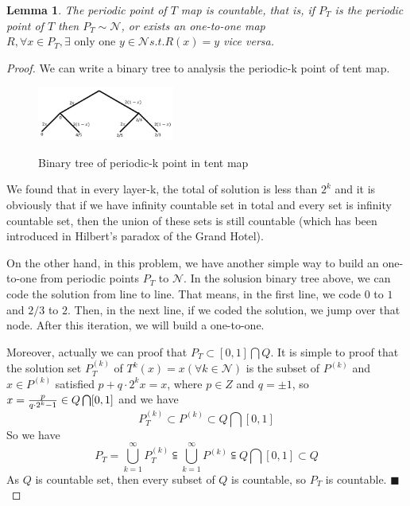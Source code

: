 \documentclass[12pt]{article}
\theoremstyle{plain}
\newtheorem{lemma}{\textbf{Lemma}}[section]
\newtheorem{proof}{\textit{PROOF}}[section]
\begin{document}
\newpage
\begin{lemma} The periodic point of $T$ map is countable, that is, if $P_T$ is the periodic point of $T$ then $P_T \sim \mathcal N$, or exists an one-to-one map $R, \forall x \in P_T, \exists \text{ only one } y \in \mathcal N s.t. R(x) = y$ vice versa.
\end{lemma}
{\color{blue}
\begin{proof}
We can write a binary tree to analysis the periodic-k point of tent map.
\begin{figure}[H]
\begin{center}
\includegraphics[width=0.4\textwidth]{figure/section3/solution-tent.png} \\
\caption{Binary tree of periodic-k point in tent map}
\end{center}
\end{figure}
We found that in every layer-k, the total of solution is less than $2^k$ and it is obviously that if we have infinity countable set in total and every set is infinity countable set, then the union of these sets is still countable (which has been introduced in Hilbert's paradox of the Grand Hotel).

On the other hand, in this problem, we have another simple way to build an one-to-one from periodic points $P_T$ to $\mathcal N$. In the solusion binary tree above, we can code the solution from line to line. That means, in the first line, we code $0$ to $1$ and $2/3$ to $2$. Then, in the next line, if we coded the solution, we jump over that node. After this iteration, we will build a one-to-one.

Moreover, actually we can proof that $P_T \subset [0, 1]\bigcap Q$. It is simple to proof that the solution set $P_T^{(k)}$ of $T^k(x) = x(\forall k \in \mathcal N)$ is the subset of $P^{(k)}$ and $x \in P^{(k)} $ satisfied $p+q\cdot 2^k x = x$, where $p \in Z$ and $q = \pm 1$, so $x = {p \over q\cdot2^k - 1}\in Q\bigcap[0, 1]$ and we have
$$
P^{(k)}_T \subset P^{(k)} \subset Q\bigcap[0, 1]
$$
So we have
$$
P_T = \bigcup_{k = 1}^{\infty}P^{(k)}_T \subseteqq \bigcup_{k = 1}^{\infty} P^{(k)} \subseteqq Q\bigcap[0, 1] \subset Q
$$
As $Q$ is countable set, then every subset of $Q$ is countable, so $P_T$ is countable. $\blacksquare$
\end{proof}
}
\end{document}
